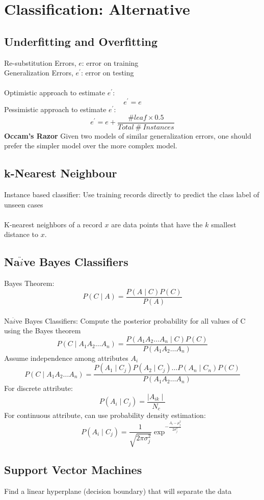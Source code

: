 \chapter{Classification: Alternative} 

\section{Underfitting and Overfitting}
Re-substitution Errors, $e$: error on training
 \\
Generalization Errors, $e^{'}$: error on testing \\
\\
Optimistic approach to estimate $e^{'}$:
$$e^{'}=e$$
Pessimistic approach to estimate $e^{'}$:
$$e^{'}=e + \frac{\# leaf \times 0.5}{Total\ \# \ Instances}$$
\textbf{Occam's Razor} Given two models of similar generalization errors, one should prefer the simpler model over the more complex model.

\section{k-Nearest Neighbour}
Instance based classifier: Use training records directly to predict the class label of unseen cases \\ \\
K-nearest neighbors of a record $x$ are data points that have the $k$ smallest distance to $x$. \\

\section{Na$\ddot{i}$ve Bayes Classifiers}

Bayes Theorem:
$$P(C\mid A) = \frac{P(A\mid C)P(C)}{P(A)}$$
\\
Na$\ddot{i}$ve Bayes Classifiers: Compute the posterior probability for all values of C using the Bayes theorem
$$P(C\mid A_1 A_2 \ldots A_n) = \frac{P(A_1 A_2 \ldots A_n\mid C)P(C)}{P(A_1 A_2 \ldots A_n)}$$
Assume independence among attributes $A_i$
$$P(C\mid A_1 A_2 \ldots A_n) = \frac{P(A_1\mid C_j)P(A_2\mid C_j)\ldots P(A_n\mid C_n) P(C)}{P(A_1 A_2 \ldots A_n)}$$
For discrete attribute:
$$P(A_i\mid C_j)=\frac{\mid A_{ik} \mid}{N_c}$$
For continuous attribute, can use probability density estimation:
$$P(A_i\mid C_j)=\frac{1}{\sqrt{2\pi \sigma_j^{2}}}\exp^{-\frac{A_i-\mu_j^{2}}{2\sigma_j^{2}}}$$
\section{Support Vector Machines}
Find a linear hyperplane (decision boundary) that will separate the data

